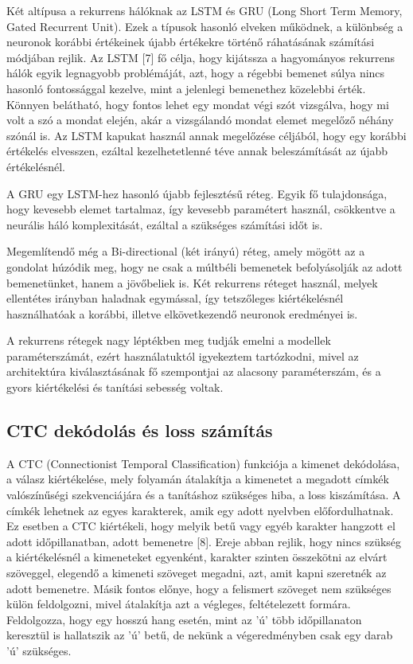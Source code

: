 Két altípusa a rekurrens hálóknak az LSTM és GRU (Long Short Term Memory, Gated Recurrent Unit). Ezek a típusok hasonló elveken működnek, a különbség a neuronok korábbi értékeinek újabb értékekre történő ráhatásának számítási módjában rejlik. Az LSTM [7] fő célja, hogy kijátssza a hagyományos rekurrens hálók egyik legnagyobb problémáját, azt, hogy a régebbi bemenet súlya nincs hasonló fontossággal kezelve, mint a jelenlegi bemenethez közelebbi érték. Könnyen belátható, hogy fontos lehet egy mondat végi szót vizsgálva, hogy mi volt a szó a mondat elején, akár a vizsgálandó mondat elemet megelőző néhány szónál is. Az LSTM kapukat használ annak megelőzése céljából, hogy egy korábbi értékelés elvesszen, ezáltal kezelhetetlenné téve annak beleszámítását az újabb értékelésnél.

A GRU egy LSTM-hez hasonló újabb fejlesztésű réteg. Egyik fő tulajdonsága, hogy kevesebb elemet tartalmaz, így kevesebb paramétert használ, csökkentve a neurális háló komplexitását, ezáltal a szükséges számítási időt is.

Megemlítendő még a Bi-directional (két irányú) réteg, amely mögött az a gondolat húzódik meg, hogy ne csak a múltbéli bemenetek befolyásolják az adott bemenetünket, hanem a jövőbeliek is. Két rekurrens réteget használ, melyek ellentétes irányban haladnak egymással, így tetszőleges kiértékelésnél használhatóak a korábbi, illetve elkövetkezendő neuronok eredményei is.

A rekurrens rétegek nagy léptékben meg tudják emelni a modellek paraméterszámát, ezért használatuktól igyekeztem tartózkodni, mivel az architektúra kiválasztásának fő szempontjai az alacsony paraméterszám, és a gyors kiértékelési és tanítási sebesség voltak.

\subsection{CTC dekódolás és loss számítás}

A CTC (Connectionist Temporal Classification) \cite{ctc} funkciója a kimenet dekódolása, a válasz kiértékelése, mely folyamán átalakítja a kimenetet a megadott címkék valószínűségi szekvenciájára és a tanításhoz szükséges hiba, a loss kiszámítása. A címkék lehetnek az egyes karakterek, amik egy adott nyelvben előfordulhatnak. Ez esetben a CTC kiértékeli, hogy melyik betű vagy egyéb karakter hangzott el adott időpillanatban, adott bemenetre [8]. Ereje abban rejlik, hogy nincs szükség a kiértékelésnél a kimeneteket egyenként, karakter szinten összekötni az elvárt szöveggel, elegendő a kimeneti szöveget megadni, azt, amit kapni szeretnék az adott bemenetre. Másik fontos előnye, hogy a felismert szöveget nem szükséges külön feldolgozni, mivel átalakítja azt a végleges, feltételezett formára. Feldolgozza, hogy egy hosszú hang esetén, mint az ’ú’ több időpillanaton keresztül is hallatszik az ’ú’ betű, de nekünk a végeredményben csak egy darab ’ú’ szükséges.

